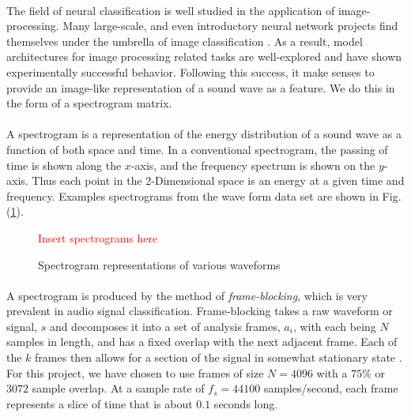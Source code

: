 \documentclass[12pt,letterpaper]{article}
\begin{document}
\paragraph*{}The field of neural classification is well studied in the application of image-processing. Many large-scale, and even introductory neural network projects find themselves under the umbrella of image classification \cite{Geron,Goodfellow,Loy,Mierswa}. As a result, model architectures for image processing related tasks are well-explored and have shown experimentally successful behavior. Following this success, it make senses to provide an image-like representation of a sound wave as a feature. We do this in the form of a spectrogram matrix.

\paragraph*{}A spectrogram is a representation of the energy distribution of a sound wave as a function of both space and time. In a conventional spectrogram, the passing of time is shown along the $x$-axis, and the frequency spectrum is shown on the $y$-axis. Thus each point in the 2-Dimensional space is an energy at a given time and frequency. Examples spectrograms from the wave form data set are shown in Fig. (\ref{fig-spectrograms}).

\begin{figure}[H]
\begin{center}
\label{fig-spectrograms}
\textcolor{red}{Insert spectrograms here}
\caption{Spectrogram representations of various waveforms}
\end{center}
\end{figure}

\paragraph*{}A spectrogram is produced by the method of \textit{frame-blocking}, which is very prevalent in audio signal classification. Frame-blocking takes a raw waveform or signal, $s$ and decomposes it into a set of analysis frames, $a_i$, with each being $N$ samples in length, and has a fixed overlap with the next adjacent frame. Each of the $k$ frames then allows for a section of the signal in somewhat stationary state \cite{Liu,Zhang,Kahn,Virtanen}. For this project, we have chosen to use frames of size $N = 4096$ with a $75\%$ or $3072$ sample overlap. At a sample rate of $f_s = 44100$ samples/second, each frame represents a slice of time that is about $0.1$ seconds long. 
\end{document}
